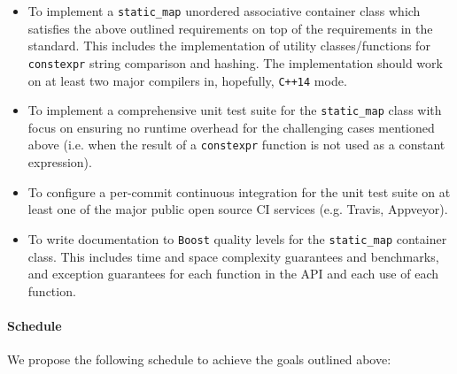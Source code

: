 \documentclass[a4paper,12pt]{article}
\begin{document}
\begin{itemize}
\begin{spacing}{0.8}
\begin{lstlisting}
// Challenging: should only generate code loading immediately from a memory location. 
// It must NOT generate any additional runtime overhead like hashing or searching.
char const* what_is_8 = cmap[8];

// Challenging: again, should only generate code loading from memory.
auto cmap2 = make_static_map(map_data);
auto& at_0 = map_data[0];
at_0 = "orange";
\end{lstlisting}
\end{spacing}
    
        If all inputs for a \texttt{constexpr} operation are constant expressions, but the result is not used as a constant expression, then the compiler in \textit{not required} to execute the operation at compile-time. This is what makes lines 19, 23 and 24 so challenging.

    \item To implement a \texttt{static\_map} unordered associative container class which satisfies the above outlined requirements on top of the requirements in the standard. This includes the implementation of utility classes/functions for \texttt{constexpr} string comparison and hashing. The implementation should work on at least two major compilers in, hopefully, \texttt{C++14} mode.

    \item To implement a comprehensive unit test suite for the \texttt{static\_map} class with focus on ensuring no runtime overhead for the challenging cases mentioned above (i.e. when the result of a \texttt{constexpr} function is not used as a constant expression).

    \item To configure a per-commit continuous integration for the unit test suite on at least one of the major public open source CI services (e.g. Travis, Appveyor).

    \item To write documentation to \texttt{Boost} quality levels for the \texttt{static\_map} container class. This includes time and space complexity guarantees and benchmarks, and exception guarantees for each function in the API and each use of each function. 
    \end{itemize}


    \paragraph{Schedule} We propose the following schedule to achieve the goals outlined above:
\end{document}
